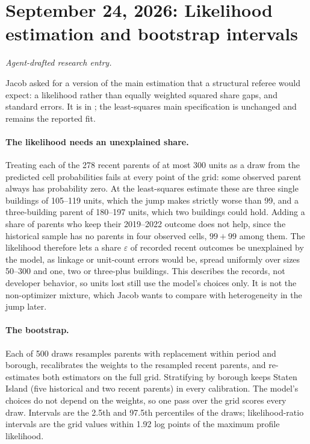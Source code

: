 \clearpage
\section*{September 24, 2026: Likelihood estimation and bootstrap intervals}
\textit{Agent-drafted research entry.}

Jacob asked for a version of the main estimation that a structural referee
would expect: a likelihood rather than equally weighted squared share gaps,
and standard errors. It is  in
; the least-squares main specification is
unchanged and remains the reported fit.

\paragraph{The likelihood needs an unexplained share.} Treating each of the
278 recent parents of at most 300 units as a draw from the predicted cell
probabilities fails at every point of the grid: some observed parent always
has probability zero. At the least-squares estimate these are three single
buildings of 105--119 units, which the jump makes strictly worse than 99, and a
three-building parent of 180--197 units, which two buildings could hold.
Adding a share of parents who keep their 2019--2022 outcome does not help,
since the historical sample has no parents in four observed cells, $99+99$
among them. The likelihood therefore lets a share $\varepsilon$ of recorded
recent outcomes be unexplained by the model, as linkage or unit-count errors
would be, spread uniformly over sizes 50--300 and one, two or three-plus
buildings. This describes the records, not developer behavior, so units lost
still use the model's choices only. It is not the non-optimizer mixture, which
Jacob wants to compare with heterogeneity in the jump later.

\paragraph{The bootstrap.} Each of 500 draws resamples parents with
replacement within period and borough, recalibrates the weights to the
resampled recent parents, and re-estimates both estimators on the full grid.
Stratifying by borough keeps Staten Island (five historical and two recent
parents) in every calibration. The model's choices do not depend on the
weights, so one pass over the grid scores every draw. Intervals are the 2.5th
and 97.5th percentiles of the draws; likelihood-ratio intervals are the grid
values within 1.92 log points of the maximum profile likelihood.

